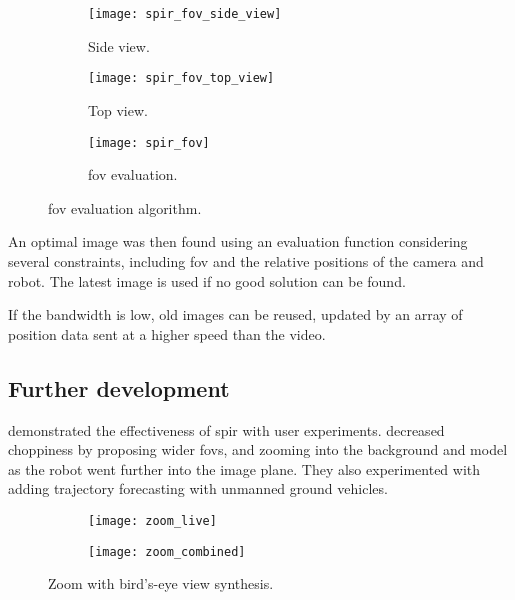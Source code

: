   \begin{figure}[h]
    \centering
    \begin{subfigure}[b]{0.3\textwidth}
      \texttt{[image: spir\_fov\_side\_view]}
      \caption{Side view.}
      \label{fig:spir_fov_side_view}
    \end{subfigure}
    \hfill
    \begin{subfigure}[b]{0.3\textwidth}
      \texttt{[image: spir\_fov\_top\_view]}
      \caption{Top view.}
      \label{fig:spir_fov_top_view}
    \end{subfigure}
    \hfill
    \begin{subfigure}[b]{0.3\textwidth}
      \texttt{[image: spir\_fov]}
      \caption{\Gls{fov} evaluation.}
      \label{fig:spir_fov_flowchart}
    \end{subfigure}
    \caption[\acrshort{spir} \gls{fov} evaluation algorithm]{\Gls{fov} evaluation algorithm.\cite{shiroma2004}}
    \label{fig:spir_fov}
  \end{figure}

  An optimal image was then found using an evaluation function considering several constraints, including \gls{fov} and the relative positions of the camera and robot.
  The latest image is used if no good solution can be found.

  If the bandwidth is low, old images can be reused, updated by an array of position data sent at a higher speed than the video.

  \subsection{Further development}
    \textcite{sugimoto2005} demonstrated the effectiveness of \gls{spir} with user experiments.
    \textcite{ito2008} decreased choppiness by proposing wider \glspl{fov}, and zooming into the background and model as the robot went further into the image plane.
    They also experimented with adding trajectory forecasting with unmanned ground vehicles.

    \begin{figure}[h]
      \centering
      \begin{subfigure}[b]{0.45\textwidth}
	\texttt{[image: zoom\_live]}
      \end{subfigure}
      \hfill
      \begin{subfigure}[b]{0.45\textwidth}
	\texttt{[image: zoom\_combined]}
      \end{subfigure}
      \caption[\acrshort{spir} with zoom]{Zoom with bird's-eye view synthesis.\cite{ito2008}}
      \label{fig:zoom_results}
    \end{figure}

